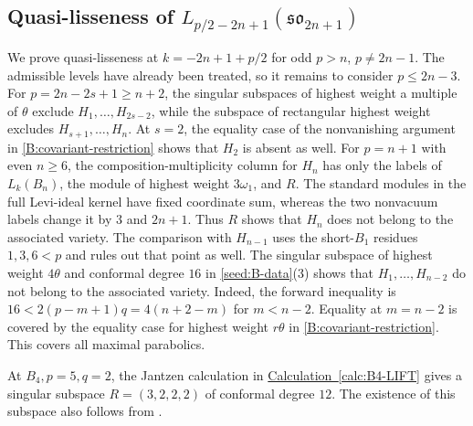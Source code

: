 \documentclass[11pt,a4paper]{amsart}
\numberwithin{equation}{section}
\theoremstyle{definition}
\theoremstyle{remark}
\newcommand{\sog}{\mathfrak{so}}
\begin{document}
\subsection{\texorpdfstring{Quasi-lisseness of $L_{p/2-2n+1}(\sog_{2n+1})$}{Quasi-lisseness of L(p/2-2n+1)(so(2n+1))}}\label{B:half-integral}
We prove quasi-lisseness at $k=-2n+1+p/2$ for odd $p>n$,
$p\ne2n-1$. The admissible levels have already been treated, so it
remains to consider $p\le2n-3$.
For $p=2n-2s+1\ge n+2$, the singular subspaces of highest weight
a multiple of $\theta$ exclude $H_1,\ldots,H_{2s-2}$, while the
subspace of rectangular highest weight excludes $H_{s+1},\ldots,H_n$.
At $s=2$, the equality case of the nonvanishing argument in
\cref{B:covariant-restriction} shows that $H_2$ is absent as well.
For $p=n+1$ with even $n\ge6$, the composition-multiplicity column for $H_n$ has only
the labels of $L_k(B_n)$, the module of highest weight $3\omega_1$,
and $R$. The standard modules in the full Levi-ideal kernel have fixed
coordinate sum, whereas the two nonvacuum labels change it by $3$ and
$2n+1$. Thus $R$ shows that $H_n$ does not belong to the associated variety. The comparison with $H_{n-1}$ uses
the short-$B_1$ residues $1,3,6<p$ and rules out that point as well.
The singular subspace of highest weight $4\theta$ and conformal degree
$16$ in \cref{seed:B-data}(3) shows that $H_1,\ldots,H_{n-2}$ do not belong to the associated variety.
Indeed, the forward inequality is
$16<2(p-m+1)q=4(n+2-m)$ for $m<n-2$. Equality at $m=n-2$
is covered by the equality case for highest weight $r\theta$ in
\cref{B:covariant-restriction}.
This covers all maximal parabolics.
%

At $B_4,p=5,q=2$, the Jantzen calculation in
\hyperref[calc:B4-LIFT]{Calculation~\ref*{calc:B4-LIFT}}
gives a singular subspace $R=(3,2,2,2)$ of conformal degree $12$.
The existence of this subspace also follows from
\cite[Theorem~4.8(5) and Corollary~5.11]{JiangWu2026}.
\end{document}
